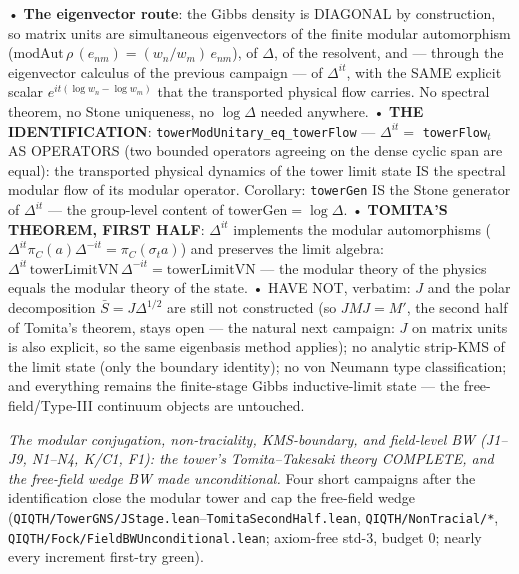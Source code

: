 \documentclass[11pt,a4paper]{article}
\begin{document}
  • \textbf{The eigenvector route}: the Gibbs density is DIAGONAL by construction, so matrix units are simultaneous eigenvectors of the finite modular automorphism ($\mathrm{modAut}\,\rho\,(e_{nm}) = (w_n/w_m)\,e_{nm}$), of $\Delta$, of the resolvent, and — through the eigenvector calculus of the previous campaign — of $\Delta^{it}$, with the SAME explicit scalar $e^{it(\log w_n - \log w_m)}$ that the transported physical flow carries. No spectral theorem, no Stone uniqueness, no $\log\Delta$ needed anywhere.
  • \textbf{THE IDENTIFICATION}: \texttt{towerModUnitary\_eq\_towerFlow} — $\Delta^{it} = $ \texttt{towerFlow}$_t$ AS OPERATORS (two bounded operators agreeing on the dense cyclic span are equal): the transported physical dynamics of the tower limit state IS the spectral modular flow of its modular operator. Corollary: \texttt{towerGen} IS the Stone generator of $\Delta^{it}$ — the group-level content of $\mathrm{towerGen} = \log\Delta$.
  • \textbf{TOMITA'S THEOREM, FIRST HALF}: $\Delta^{it}$ implements the modular automorphisms ($\Delta^{it}\pi_C(a)\Delta^{-it} = \pi_C(\sigma_t a)$) and preserves the limit algebra: $\Delta^{it}\,\mathrm{towerLimitVN}\,\Delta^{-it} = \mathrm{towerLimitVN}$ — the modular theory of the physics equals the modular theory of the state.
  • HAVE NOT, verbatim: $J$ and the polar decomposition $\bar S = J\Delta^{1/2}$ are still not constructed (so $JMJ = M'$, the second half of Tomita's theorem, stays open — the natural next campaign: $J$ on matrix units is also explicit, so the same eigenbasis method applies); no analytic strip-KMS of the limit state (only the boundary identity); no von Neumann type classification; and everything remains the finite-stage Gibbs inductive-limit state — the free-field/Type-III continuum objects are untouched.

\emph{The modular conjugation, non-traciality, KMS-boundary, and field-level BW (J1--J9, N1--N4, K/C1, F1): the tower's Tomita--Takesaki theory COMPLETE, and the free-field wedge BW made unconditional.} Four short campaigns after the identification close the modular tower and cap the free-field wedge (\texttt{QIQTH/TowerGNS/JStage.lean}--\texttt{TomitaSecondHalf.lean}, \texttt{QIQTH/NonTracial/*}, \texttt{QIQTH/Fock/FieldBWUnconditional.lean}; axiom-free std-3, budget 0; nearly every increment first-try green).
\end{document}
